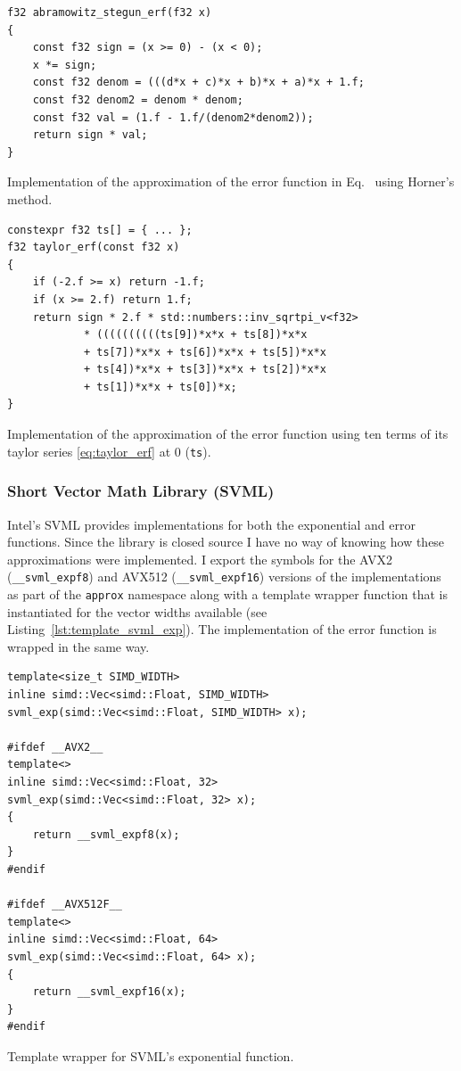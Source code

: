 \documentclass[a4paper, 11pt]{memoir}
\begin{document}
    \begin{listing}[t]
        \begin{verbatim}
f32 abramowitz_stegun_erf(f32 x)
{
    const f32 sign = (x >= 0) - (x < 0);
    x *= sign;
    const f32 denom = (((d*x + c)*x + b)*x + a)*x + 1.f;
    const f32 denom2 = denom * denom;
    const f32 val = (1.f - 1.f/(denom2*denom2));
    return sign * val;
}
        \end{verbatim}
        \caption{Implementation of the approximation of the error function in Eq.~ using Horner's method.}
        \label{lst:horner_abrasteg}
    \end{listing}

    \begin{listing}[t]
        \begin{verbatim}
constexpr f32 ts[] = { ... };
f32 taylor_erf(const f32 x)
{
    if (-2.f >= x) return -1.f;
    if (x >= 2.f) return 1.f;
    return sign * 2.f * std::numbers::inv_sqrtpi_v<f32>
            * ((((((((((ts[9])*x*x + ts[8])*x*x
            + ts[7])*x*x + ts[6])*x*x + ts[5])*x*x
            + ts[4])*x*x + ts[3])*x*x + ts[2])*x*x
            + ts[1])*x*x + ts[0])*x;
}
        \end{verbatim}
        \caption{Implementation of the approximation of the error function using ten terms of its taylor series \eqref{eq:taylor_erf} at $0$ (\texttt{ts}).}
        \label{lst:horner_taylor}
    \end{listing}

    \subsubsection{Short Vector Math Library (SVML)}
    \label{sec:svml}
    Intel's SVML provides implementations for both the exponential and error functions. Since the library is closed
    source I have no way of knowing how these approximations were implemented. I export the symbols for the AVX2
    (\texttt{__svml_expf8}) and AVX512 (\texttt{__svml_expf16}) versions of the implementations as part of
    the \texttt{approx} namespace along with a template wrapper function that is instantiated for the vector
    widths available (see Listing~\ref{lst:template_svml_exp}). The implementation of the error function is wrapped in the
    same way.

    \begin{listing}[t]
        \begin{verbatim}
template<size_t SIMD_WIDTH>
inline simd::Vec<simd::Float, SIMD_WIDTH>
svml_exp(simd::Vec<simd::Float, SIMD_WIDTH> x);

#ifdef __AVX2__
template<>
inline simd::Vec<simd::Float, 32>
svml_exp(simd::Vec<simd::Float, 32> x);
{
    return __svml_expf8(x);
}
#endif

#ifdef __AVX512F__
template<>
inline simd::Vec<simd::Float, 64>
svml_exp(simd::Vec<simd::Float, 64> x);
{
    return __svml_expf16(x);
}
#endif
        \end{verbatim}
        \caption{Template wrapper for SVML's exponential function.}
        \label{lst:template_svml_exp}
    \end{listing}
\end{document}
